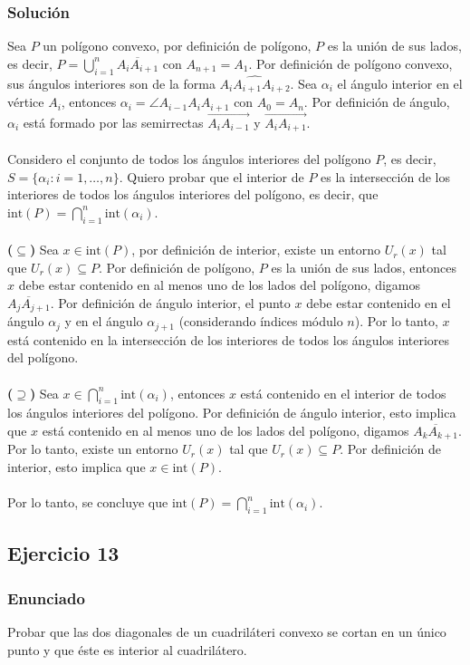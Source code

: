 \documentclass[a4paper]{article}
\begin{document}
\subsubsection{Solución}
Sea $P$ un polígono convexo, por definición de polígono, $P$ es la unión de sus lados, es decir, $P=\bigcup_{i=1}^{n} \overline{A_iA_{i+1}}$ con $A_{n+1}=A_1$. Por definición de polígono convexo, sus ángulos interiores son de la forma $\widehat{A_iA_{i+1}A_{i+2}}$. Sea $\alpha_i$ el ángulo interior en el vértice $A_i$, entonces $\alpha_i = \angle A_{i-1}A_iA_{i+1}$ con $A_0=A_n$. Por definición de ángulo, $\alpha_i$ está formado por las semirrectas $\overrightarrow{A_iA_{i-1}}$ y $\overrightarrow{A_iA_{i+1}}$.\\\\
Considero el conjunto de todos los ángulos interiores del polígono $P$, es decir, $S=\{\alpha_i : i=1,\dots,n\}$. Quiero probar que el interior de $P$ es la intersección de los interiores de todos los ángulos interiores del polígono, es decir, que $\text{int}(P) = \bigcap_{i=1}^{n} \text{int}(\alpha_i)$.\\\\
\textbf{($\subseteq$)} Sea $x \in \text{int}(P)$, por definición de interior, existe un entorno $U_r(x)$ tal que $U_r(x) \subseteq P$. Por definición de polígono, $P$ es la unión de sus lados, entonces $x$ debe estar contenido en al menos uno de los lados del polígono, digamos $\overline{A_jA_{j+1}}$. Por definición de ángulo interior, el punto $x$ debe estar contenido en el ángulo $\alpha_j$ y en el ángulo $\alpha_{j+1}$ (considerando índices módulo $n$). Por lo tanto, $x$ está contenido en la intersección de los interiores de todos los ángulos interiores del polígono.\\\\
\textbf{($\supseteq$)} Sea $x \in \bigcap_{i=1}^{n} \text{int}(\alpha_i)$, entonces $x$ está contenido en el interior de todos los ángulos interiores del polígono. Por definición de ángulo interior, esto implica que $x$ está contenido en al menos uno de los lados del polígono, digamos $\overline{A_kA_{k+1}}$. Por lo tanto, existe un entorno $U_r(x)$ tal que $U_r(x) \subseteq P$. Por definición de interior, esto implica que $x \in \text{int}(P)$.\\\\
Por lo tanto, se concluye que $\text{int}(P) = \bigcap_{i=1}^{n} \text{int}(\alpha_i)$.
\subsection{Ejercicio 13}
\subsubsection{Enunciado}
Probar que las dos diagonales de un cuadriláteri convexo se cortan en un único punto y que éste es interior al cuadrilátero.
\end{document}
